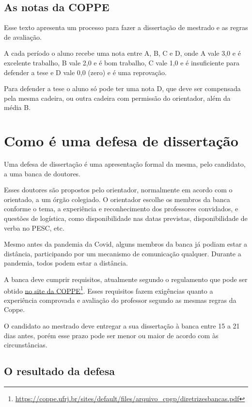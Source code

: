 \documentclass[a4paper,12pt]{report}
\begin{document}
\section{As notas da COPPE}

Esse texto apresenta um processo para fazer a dissertação de mestrado e as regras de avaliação.

A cada período o aluno recebe uma nota entre A, B, C e D, onde A vale 3,0 e é excelente trabalho, B vale 2,0 e é bom trabalho, C vale 1,0 e é insuficiente para defender a tese e D vale 0,0 (zero) e é uma reprovação.

Para defender a tese o aluno só pode ter uma nota D, que deve ser compensada pela mesma cadeira, ou outra cadeira com permissão do orientador, além da média B.



\chapter{Como é uma defesa de dissertação}

Uma defesa de dissertação é uma apresentação formal da mesma, pelo candidato, a uma banca de doutores.

Esses doutores são propostos pelo orientador, normalmente em acordo com o orientado, a um órgão colegiado. O orientador escolhe os membros da banca conforme o tema, a experiência e reconhecimento dos professores convidados, e questões de logística, como disponibilidade nas datas previstas, disponibilidade de verba no PESC, etc.

Mesmo antes da pandemia da Covid, alguns membros da banca já podiam estar a distância, participando por um mecanismo de comunicação qualquer. Durante a pandemia, todos podem estar a distância.

A banca deve cumprir requisitos, atualmente segundo o regulamento que pode ser obtido  \href{https://coppe.ufrj.br/pt-br/node/3464}{no site da COPPE}\footnote{\url{https://coppe.ufrj.br/sites/default/files/arquivo_cpgp/diretrizesbancas.pdf}}. Esses requisitos fazem exigências quanto a experiência comprovada e avaliação do professor segundo as mesmas regras da Coppe.

O candidato ao mestrado deve entregar a sua dissertação à banca entre 15 a 21 dias antes, porém esse prazo pode ser menor ou maior de acordo com às circunstâncias.

\section{O resultado da defesa}
\end{document}
